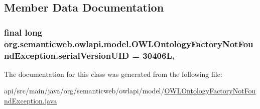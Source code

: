 \subsection{Member Data Documentation}
\hypertarget{classorg_1_1semanticweb_1_1owlapi_1_1model_1_1_o_w_l_ontology_factory_not_found_exception_a32c5cfec377e6ddbbe6d60f5f715c9ea}{
\subsubsection[{serial\-Version\-U\-I\-D}]{\setlength{\rightskip}{0pt plus 5cm}final long org.\-semanticweb.\-owlapi.\-model.\-O\-W\-L\-Ontology\-Factory\-Not\-Found\-Exception.\-serial\-Version\-U\-I\-D = 30406\-L\hspace{0.3cm}{\ttfamily [static]}, {\ttfamily [private]}}}\label{classorg_1_1semanticweb_1_1owlapi_1_1model_1_1_o_w_l_ontology_factory_not_found_exception_a32c5cfec377e6ddbbe6d60f5f715c9ea}


The documentation for this class was generated from the following file\-:\begin{DoxyCompactItemize}
\item 
api/src/main/java/org/semanticweb/owlapi/model/\hyperlink{_o_w_l_ontology_factory_not_found_exception_8java}{O\-W\-L\-Ontology\-Factory\-Not\-Found\-Exception.\-java}\end{DoxyCompactItemize}
